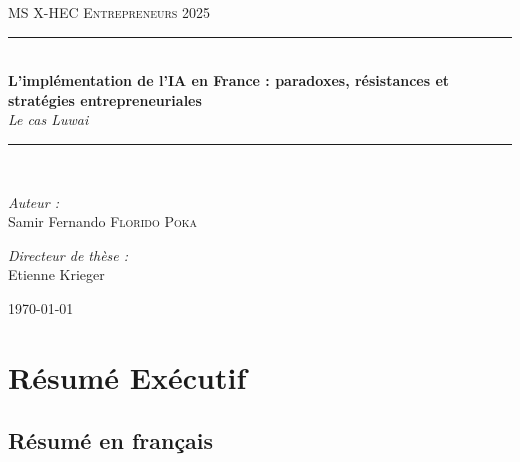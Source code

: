 \documentclass[12pt,a4paper]{report}
\newcommand{\HRule}{\rule{\linewidth}{0.5mm}}
\begin{document}
\begin{titlepage}
\begin{center}


\vspace*{2cm}

\textsc{\LARGE MS X-HEC Entrepreneurs 2025}\\[1.5cm]

\HRule \\[0.4cm]
{\huge \bfseries L'implémentation de l'IA en France : paradoxes, résistances et stratégies entrepreneuriales}\\[0.4cm]
{\large \textit{Le cas Luwai}}\\[0.4cm]
\HRule \\[1.5cm]

\noindent
\begin{minipage}{0.4\textwidth}
\begin{flushleft} \large
\emph{Auteur :}\\
Samir Fernando \textsc{Florido Poka}
\end{flushleft}
\end{minipage}%
\begin{minipage}{0.4\textwidth}
\begin{flushright} \large
\emph{Directeur de thèse :} \\
Etienne Krieger
\end{flushright}
\end{minipage}

\vfill

{\large \today}

\end{center}
\end{titlepage}


\chapter*{Résumé Exécutif}

\section*{Résumé en français}
\end{document}
